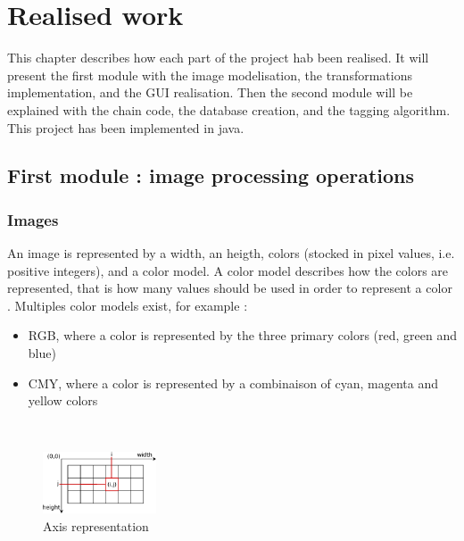 \chapter{Realised work}


This chapter describes how each part of the project hab been realised. It will present the first module with the image modelisation, the transformations implementation, and the \gls{GUI} realisation. Then the second module will be explained with the chain code, the database creation, and the tagging algorithm. This project has been implemented in java.


\section{First module : image processing operations}


\subsection{Images}

An image is represented by a width, an heigth, colors (stocked in pixel values, i.e. positive integers), and a color model. A color model describes how the colors are represented, that is how many values should be used in order to represent a color \cite{bib:image:ColorModel}. Multiples color models exist, for example : 
\begin{itemize}
	\item RGB, where a color is represented by the three primary colors (red, green and blue)
	\item CMY, where a color is represented by a combinaison of cyan, magenta and yellow colors
\end{itemize}


~~

\begin{figure}
	\centering
	\includegraphics[width=0.3\textwidth]{images/axis/axis_representation}
	\caption{Axis representation}
	\label{fig:axis representation}
\end{figure}


